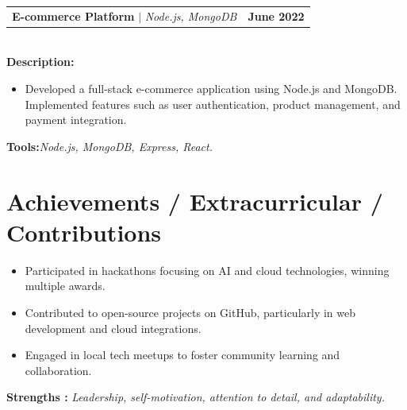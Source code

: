 \documentclass[letterpaper,11pt]{article}
\makeatletter
\newcommand{\resumeItem}[1]{
  \item\small{
    {#1 \vspace{-2pt}}
  }
}
\newcommand{\resumeProjectHeading}[2]{
    \item
    \begin{tabular*}{1.001\textwidth}{l@{\extracolsep{\fill}}r}
      \small#1 & \textbf{\small #2}\\
    \end{tabular*}\vspace{-7pt}
}
\newcommand{\resumeSubHeadingListStart}{\begin{itemize}[leftmargin=0.0in, label={}]}
\newcommand{\resumeSubHeadingListEnd}{\end{itemize}}
\newcommand{\resumeItemListStart}{\begin{itemize}}
\newcommand{\resumeItemListEnd}{\end{itemize}\vspace{-5pt}}
\makeatother
\begin{document}
\resumeProjectHeading
{\textbf{E-commerce Platform} $|$ \emph{Node.js, MongoDB}}{June 2022}\\
\vspace{6pt}
\textbf{Description:}
\vspace{-5pt}
\resumeItemListStart
\resumeItem{Developed a full-stack e-commerce application using Node.js and MongoDB. Implemented features such as user authentication, product management, and payment integration.}
\resumeItemListEnd
\vspace{4pt}
\textbf{Tools:}\emph{Node.js, MongoDB, Express, React.}
\vspace{-12pt}

\section{Achievements / Extracurricular / Contributions}
\resumeSubHeadingListStart
\resumeItemListStart
\resumeItem{Participated in hackathons focusing on AI and cloud technologies, winning multiple awards.}
\resumeItem{Contributed to open-source projects on GitHub, particularly in web development and cloud integrations.}
\resumeItem{Engaged in local tech meetups to foster community learning and collaboration.}
\resumeItemListEnd

\resumeSubHeadingListEnd
\textbf{Strengths : }\emph{Leadership, self-motivation, attention to detail, and adaptability.} \\

\vspace{10pt}
\end{document}
